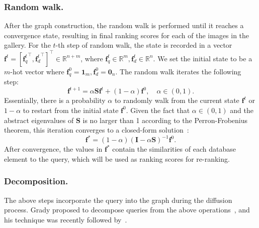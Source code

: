 \documentclass[letterpaper]{article} \usepackage{aaai19}  \usepackage{times}  \usepackage{helvet}  \usepackage{courier}  \usepackage{url}  \usepackage{graphicx}  \frenchspacing  \setlength{\pdfpagewidth}{8.5in}  \setlength{\pdfpageheight}{11in}
\begin{document}
\subsubsection{Random walk.}
After the graph construction, the random walk is performed until it reaches a convergence state, resulting in final ranking scores for each of the images in the gallery.
For the $t$-th step of random walk, the state is recorded in a vector $\mathbf{f}^t=[{\mathbf{f}_q^t}^\top, {\mathbf{f}_d^t}^\top]^\top \in \mathbb{R}^{n+m}$, where $\mathbf{f}_q^t\in \mathbb{R}^m, \mathbf{f}_d^t\in\mathbb{R}^n$.
We set the initial state to be a $m$-hot vector where $\mathbf{f}_q^0=\mathbf{1}_m, \mathbf{f}_d^0=\mathbf{0}_n$.
The random walk iterates the following step:
\begin{equation}
  \mathbf{f}^{t+1} = \alpha \mathbf{S} \mathbf{f}^t + (1-\alpha) \mathbf{f}^0, \quad \alpha \in (0, 1).
\end{equation}
Essentially, there is a probability $\alpha$ to randomly walk from the current state $\mathbf{f}^t$ or $1-\alpha$ to restart from the initial state $\mathbf{f}^0$.
Given the fact that $\alpha \in (0,1)$ and the abstract eigenvalues of $\mathbf{S}$ is no larger than 1 according to the Perron-Frobenius theorem, this iteration converges to a closed-form solution~\cite{zhou2004ranking}:
\begin{equation}
  \mathbf{f}^* = (1-\alpha)(\mathbf{I}-\alpha \mathbf{S})^{-1}\mathbf{f}^0.
\end{equation}
After convergence, the values in $\mathbf{f}^*$ contain the similarities of each database element to the query, which will be used as ranking scores for re-ranking.


\subsubsection{Decomposition.}

The above steps incorporate the query into the graph during the diffusion process.
Grady proposed to decompose queries from the above operations~\cite{grady2006random}, and his technique was recently followed by~\cite{iscen2017efficient}.
\end{document}

